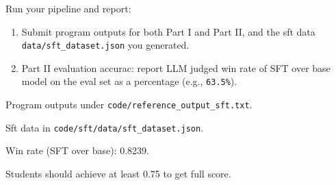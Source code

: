 \begin{Q}
\begin{enumerate}
Run your pipeline and report:
\begin{enumerate}
\item Submit program outputs for both Part I and Part II, and the sft
  data 
  \texttt{data/sft\_dataset.json} you generated.
\item Part II evaluation accurac: report LLM judged win rate of SFT
  over base model on the eval set as a percentage (e.g.,
  \texttt{63.5\%}).
\end{enumerate}

\begin{solution}

Program outputs under \texttt{code/reference\_output\_sft.txt}.

Sft data in \texttt{code/sft/data/sft\_dataset.json}.

Win rate (SFT over base): 0.8239.

Students should achieve at least 0.75 to get full score. 

\end{solution}

\end{enumerate}
\end{Q}

